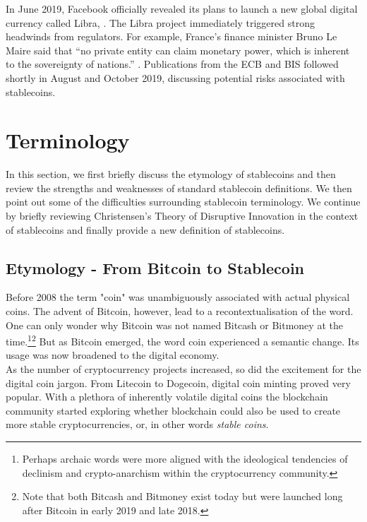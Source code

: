 \documentclass[conference]{IEEEtran}
\begin{document}
In June 2019, Facebook officially revealed its plans to launch a new global digital currency called Libra, \cite{WSJ}. The Libra project immediately triggered strong headwinds from regulators. For example, France's finance minister Bruno Le Maire said that ``no private entity can claim monetary power, which is inherent to the sovereignty of nations.'' \cite{Reuters}. Publications from the \ac{ECB} and \ac{BIS} followed shortly in August and October 2019, discussing potential risks associated with stablecoins.

\section{Terminology}
In this section, we first briefly discuss the etymology of stablecoins and then review the strengths and weaknesses of standard stablecoin definitions. We then point out some of the difficulties surrounding stablecoin terminology. We continue by briefly reviewing Christensen's Theory of Disruptive Innovation in the context of stablecoins and finally provide a new definition of stablecoins.

\subsection{Etymology - From Bitcoin to Stablecoin}
Before 2008 the term "coin" was unambiguously associated with actual physical coins. The advent of Bitcoin, however, lead to a recontextualisation of the word. One can only wonder why Bitcoin was not named Bitcash or Bitmoney at the time.\footnote{Perhaps archaic words were more aligned with the ideological tendencies of declinism and crypto-anarchism within the cryptocurrency community.}\footnote{Note that both Bitcash and Bitmoney exist today but were launched long after Bitcoin in early 2019 and late 2018.} But as Bitcoin emerged, the word coin experienced a semantic change. Its usage was now broadened to the digital economy.\\

As the number of cryptocurrency projects increased, so did the excitement for the digital coin jargon. From Litecoin to Dogecoin, digital coin minting proved very popular. With a plethora of inherently volatile digital coins the blockchain community started exploring whether blockchain could also be used to create more stable cryptocurrencies, or, in other words \emph{stable coins}.\\ %
\end{document}
